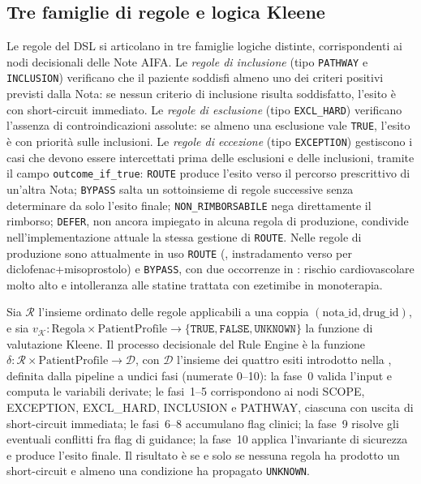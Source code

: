 \subsection{Tre famiglie di regole e logica Kleene}
\label{subsec:famiglie-regole}

Le regole del DSL si articolano in tre famiglie logiche distinte, corrispondenti
ai nodi decisionali delle Note AIFA.
Le \emph{regole di inclusione} (tipo \texttt{PATHWAY} e \texttt{INCLUSION})
verificano che il paziente soddisfi almeno uno dei criteri positivi previsti
dalla Nota: se nessun criterio di inclusione risulta soddisfatto,
l'esito è  con short-circuit immediato.
Le \emph{regole di esclusione} (tipo \texttt{EXCL\_HARD}) verificano
l'assenza di controindicazioni assolute: se almeno una esclusione vale
\texttt{TRUE}, l'esito è  con priorità
sulle inclusioni.
Le \emph{regole di eccezione} (tipo \texttt{EXCEPTION}) gestiscono
i casi che devono essere intercettati prima delle esclusioni e delle
inclusioni, tramite il campo \texttt{outcome\_if\_true}: \texttt{ROUTE}
produce l'esito  verso il percorso prescrittivo di
un'altra Nota; \texttt{BYPASS} salta un sottoinsieme di regole successive
senza determinare da solo l'esito finale; \texttt{NON\_RIMBORSABILE} nega
direttamente il rimborso; \texttt{DEFER}, non ancora impiegato in alcuna
regola di produzione, condivide nell'implementazione attuale la stessa
gestione di \texttt{ROUTE}. Nelle regole di produzione sono attualmente in uso
\texttt{ROUTE} (\notezero, instradamento verso \notesessanta per
diclofenac+misoprostolo) e \texttt{BYPASS}, con due occorrenze in
\notetredici: rischio cardiovascolare molto alto e intolleranza alle
statine trattata con ezetimibe in monoterapia.

\begin{definition}
\label{def:decisione}
Sia $\mathcal{R}$ l'insieme ordinato delle regole applicabili a una coppia
$(\text{nota\_id}, \text{drug\_id})$, e sia
$v_\mathcal{K} \colon \text{Regola} \times \text{PatientProfile}
\to \{\texttt{TRUE}, \texttt{FALSE}, \texttt{UNKNOWN}\}$
la funzione di valutazione Kleene.
Il processo decisionale del Rule Engine è la funzione
$\delta \colon \mathcal{R} \times \text{PatientProfile} \to \mathcal{D}$,
con $\mathcal{D}$ l'insieme dei quattro esiti introdotto nella
,
definita dalla pipeline a undici fasi (numerate 0--10): la fase~0 valida
l'input e computa le variabili derivate; le fasi~1--5 corrispondono ai nodi
SCOPE, EXCEPTION, EXCL\_HARD, INCLUSION e PATHWAY, ciascuna con uscita
di short-circuit immediata; le fasi~6--8 accumulano flag clinici;
la fase~9 risolve gli eventuali conflitti fra flag di guidance;
la fase~10 applica l'invariante di sicurezza e produce l'esito finale.
Il risultato è  se e solo se nessuna
regola ha prodotto un short-circuit e almeno una condizione ha
propagato \texttt{UNKNOWN}.
\end{definition}

